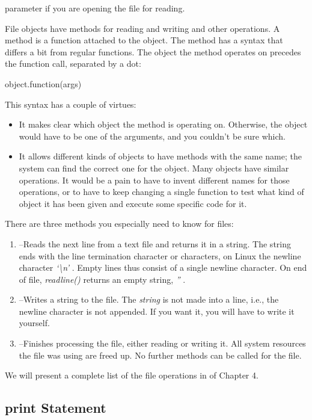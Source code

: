 parameter if you are opening the file for reading.

File objects have methods for
reading and writing and other operations. A method is a function
attached to the object. The method has a syntax that differs a bit from
regular functions. The object the method operates on precedes the
function call, separated by a dot:

object.function(args)

This syntax has a couple of
virtues:

\begin{itemize}
\tightlist
\item
  It makes clear which object the
  method is operating on. Otherwise, the object would have to be one of
  the arguments, and you couldn't be sure which.
\item
  It allows different kinds of
  objects to have methods with the same name; the system can find the
  correct one for the object. Many objects have similar operations. It
  would be a pain to have to invent different names for those
  operations, or to have to keep changing a single function to test what
  kind of object it has been given and execute some specific code for
  it.
\end{itemize}

There are three methods you
especially need to know for files:

\begin{enumerate}
\tightlist
\item
   --Reads the
  next line from a text file and returns it in a string. The string ends
  with the line termination character or characters, on Linux the
  newline character \emph{`\textbackslash{}n'} . Empty lines thus
  consist of a single newline character. On end of file,
  \emph{readline()} returns an empty string, \emph{''} .
\item
   --Writes
  a string to the file. The \emph{string} is not made into a line, i.e.,
  the newline character is not appended. If you want it, you will have
  to write it yourself.
\item
   --Finishes
  processing the file, either reading or writing it. All system
  resources the file was using are freed up. No further methods can be
  called for the file.
\end{enumerate}

We will present a complete list of
the file operations in \href{chap4.html\#22958}{} of Chapter 4.

\subsection{print Statement}
\label{print-statement}

